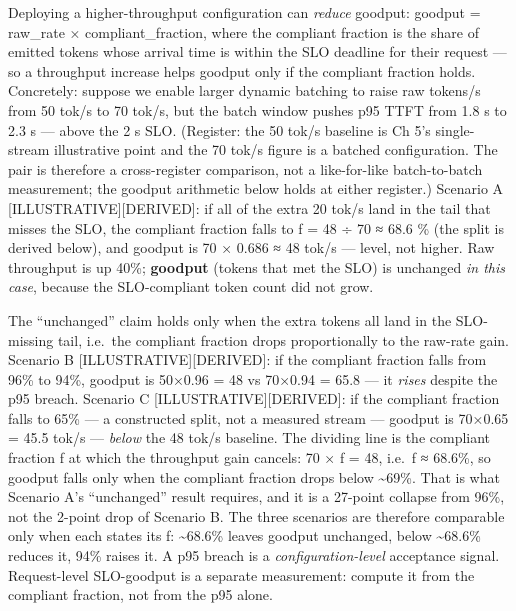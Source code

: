 Deploying a higher-throughput configuration can \emph{reduce} goodput:
goodput = raw\_rate × compliant\_fraction, where the compliant fraction
is the share of emitted tokens whose arrival time is within the SLO
deadline for their request --- so a throughput increase helps goodput
only if the compliant fraction holds. Concretely: suppose we enable
larger dynamic batching to raise raw tokens/s from 50 tok/s to 70 tok/s,
but the batch window pushes p95 TTFT from 1.8 s to 2.3 s --- above the 2
s SLO. (Register: the 50 tok/s baseline is Ch 5's single-stream
illustrative point and the 70 tok/s figure is a batched configuration.
The pair is therefore a cross-register comparison, not a like-for-like
batch-to-batch measurement; the goodput arithmetic below holds at either
register.) Scenario A \mbox{{[}ILLUSTRATIVE{]}}\hspace{0pt}\mbox{{[}DERIVED{]}}: if all of the
extra 20 tok/s land in the tail that misses the SLO, the compliant
fraction falls to f = 48 ÷ 70 ≈ 68.6 \% (the split is derived below),
and goodput is 70 × 0.686 ≈ 48 tok/s --- level, not higher. Raw
throughput is up 40\%; \textbf{goodput} (tokens that met the SLO) is
unchanged \emph{in this case}, because the SLO-compliant token count did
not grow.

The ``unchanged'' claim holds only when the extra tokens all land in the
SLO-missing tail, i.e.~the compliant fraction drops proportionally to
the raw-rate gain. Scenario B \mbox{{[}ILLUSTRATIVE{]}}\hspace{0pt}\mbox{{[}DERIVED{]}}: if the
compliant fraction falls from 96\% to 94\%, goodput is 50×0.96 = 48 vs
70×0.94 = 65.8 --- it \emph{rises} despite the p95 breach. Scenario C
\mbox{{[}ILLUSTRATIVE{]}}\hspace{0pt}\mbox{{[}DERIVED{]}}: if the compliant fraction falls to 65\%
--- a constructed split, not a measured stream --- goodput is 70×0.65 =
45.5 tok/s --- \emph{below} the 48 tok/s baseline. The dividing line is
the compliant fraction f at which the throughput gain cancels: 70 × f =
48, i.e.~f ≈ 68.6\%, so goodput falls only when the compliant fraction
drops below \textasciitilde69\%. That is what Scenario A's ``unchanged''
result requires, and it is a 27-point collapse from 96\%, not the
2-point drop of Scenario B. The three scenarios are therefore comparable
only when each states its f: \textasciitilde68.6\% leaves goodput
unchanged, below \textasciitilde68.6\% reduces it, 94\% raises it. A p95
breach is a \emph{configuration-level} acceptance signal. Request-level
SLO-goodput is a separate measurement: compute it from the compliant
fraction, not from the p95 alone.

